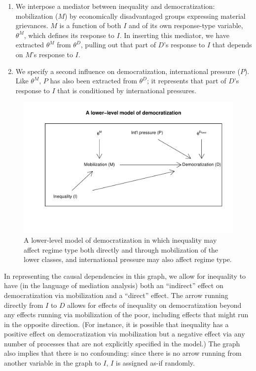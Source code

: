 \documentclass[12pt,]{book}
\begin{document}
\begin{enumerate}
\def\labelenumi{\arabic{enumi}.}
\item
  We interpose a mediator between inequality and democratization: mobilization (\(M\)) by economically disadvantaged groups expressing material grievances. \(M\) is a function of both \(I\) and of its own response-type variable, \(\theta^M\), which defines its response to \(I\). In inserting this mediator, we have extracted \(\theta^M\) from \(\theta^D\), pulling out that part of \(D\)'s response to \(I\) that depends on \(M\)'s response to \(I\).
\item
  We specify a second influence on democratization, international pressure (\(P\)). Like \(\theta^M\), \(P\) has also been extracted from \(\theta^D\); it represents that part of \(D\)'s response to \(I\) that is conditioned by international pressures.
\end{enumerate}

\begin{figure}

{\centering \includegraphics[width=.7\textwidth]{ii_files/figure-latex/unnamed-chunk-41-1} 

}

\caption{\label{fig:lowdem} A lower-level model of democratization in which inequality may affect regime type both directly and through mobilization of the lower classes, and international pressure may also affect regime type.}\label{fig:unnamed-chunk-41}
\end{figure}

In representing the causal dependencies in this graph, we allow for inequality to have (in the language of mediation analysis) both an ``indirect'' effect on democratization via mobilization and a ``direct'' effect. The arrow running directly from \(I\) to \(D\) allows for effects of inequality on democratization beyond any effects running via mobilization of the poor, including effects that might run in the opposite direction. (For instance, it is possible that inequality has a positive effect on democratization via mobilization but a negative effect via any number of processes that are not explicitly specified in the model.) The graph also implies that there is no confounding: since there is no arrow running from another variable in the graph to \(I\), \(I\) is assigned as-if randomly.
\end{document}

